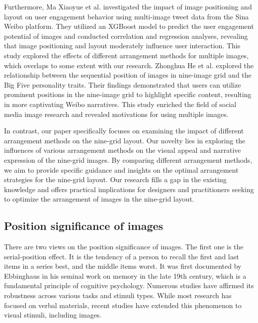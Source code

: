 Furthermore, Ma Xiaoyue et al\cite{ma2021image}. investigated the impact of image positioning and layout on user engagement behavior using multi-image tweet data from the Sina Weibo platform. They utilized an XGBoost model to predict the user engagement potential of images and conducted correlation and regression analyses, revealing that image positioning and layout moderately influence user interaction. This study explored the effects of different arrangement methods for multiple images, which overlaps to some extent with our research. Zhonghua He et al\cite{ma2023suggest}. explored the relationship between the sequential position of images in nine-image grid and the Big Five personality traits. Their findings demonstrated that users can utilize prominent positions in the nine-image grid to highlight specific content, resulting in more captivating Weibo narratives. This study enriched the field of social media image research and revealed motivations for using multiple images.

In contrast, our paper specifically focuses on examining the impact of different arrangement methods on the nine-grid layout. Our novelty lies in exploring the influences of various arrangement methods on the visual appeal and narrative expression of the nine-grid images. By comparing different arrangement methods, we aim to provide specific guidance and insights on the optimal arrangement strategies for the nine-grid layout. Our research fills a gap in the existing knowledge and offers practical implications for designers and practitioners seeking to optimize the arrangement of images in the nine-grid layout.

\subsection{Position significance of images}

There are two views on the position significance of images. The first one is the serial-position effect. It is the tendency of a person to recall the first and last items in a series best, and the middle items worst\cite{colman2015dictionary}. It was first documented by Ebbinghaus\cite{ebbinghaus1885gedachtnis} in his seminal work on memory in the late 19th century, which is a fundamental principle of cognitive psychology. Numerous studies have affirmed its robustness across various tasks and stimuli types. While most research has focused on verbal materials, recent studies have extended this phenomenon to visual stimuli, including images.

